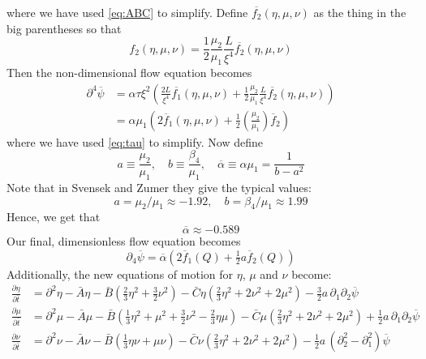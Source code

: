 \documentclass[reqno]{article}
\begin{document}
	where we have used \eqref{eq:ABC} to simplify. Define $\overline{f_2}(\eta, \mu, \nu)$ as the thing in the big parentheses so that
	\begin{equation}
		f_2(\eta, \mu, \nu) = \frac12 \frac{\mu_2}{\mu_1} \frac{L}{\xi^4} \overline{f_2}(\eta, \mu, \nu)
	\end{equation}
	Then the non-dimensional flow equation becomes
	\begin{equation}
	\begin{split}
		\partial^4 \overline{\psi}
		&= \alpha \tau \xi^2 \left(
		\frac{2L}{\xi^4} \overline{f_1}(\eta, \mu, \nu)
		+ \frac12 \frac{\mu_2}{\mu_1} \frac{L}{\xi^4} \overline{f_2}(\eta, \mu, \nu)
		\right) \\
		&= \alpha \mu_1 \left(
		2 \overline{f}_1 (\eta, \mu, \nu)
		+ \frac12 \left( \frac{\mu_2}{\mu_1} \right) \overline{f}_2
		\right)
	\end{split}
	\end{equation}
	where we have used \eqref{eq:tau} to simplify. Now define
	\begin{equation} \label{eq:dimensionless-constants}
		a \equiv \frac{\mu_2}{\mu_1},
		\quad
		b \equiv \frac{\beta_4}{\mu_1},
		\quad
		\overline{\alpha} \equiv \alpha \mu_1
		= \frac{1}{b - a^2}
	\end{equation}
	Note that in Svensek and Zumer they give the typical values:
	\begin{equation}
		a = \mu_2/\mu_1 \approx -1.92,
		\quad b = \beta_4/\mu_1 \approx 1.99
	\end{equation}
	Hence, we get that
	\begin{equation}
		\overline{\alpha} \approx -0.589
	\end{equation}
	Our final, dimensionless flow equation becomes
	\begin{equation}
		\partial_4 \overline{\psi}
		= \overline{\alpha} \left(
		2 \overline{f}_1 (Q)
		+ \tfrac12 a \overline{f}_2 (Q)
		\right)
	\end{equation}
	Additionally, the new equations of motion for $\eta$, $\mu$ and $\nu$ become:
	\begin{equation}\label{eq:dimensionless-flow-eoms}
	\begin{split}
		\frac{\partial \eta}{\partial \bar{t}} &= \partial^2 \eta - \bar{A}\eta - \bar{B}\left( \tfrac 23 \eta^2 + \tfrac 32 \nu^2\right) - \bar{C} \eta \left( \tfrac23 \eta^2 + 2\nu^2 + 2\mu^2\right) - \tfrac32 a\,\partial_1 \partial_2 \overline{\psi} \\
		\frac{\partial \mu}{\partial \bar{t}} &= \partial^2 \mu - \bar{A}\mu - \bar{B}\left( \tfrac13 \eta^2 + \mu^2 + \tfrac32 \nu^2 - \tfrac23 \eta \mu \right) - \bar{C}\mu\left(\tfrac23 \eta^2 + 2\nu^2 + 2\mu^2\right) + \tfrac12 a\,\partial_1 \partial_2 \overline{\psi} \\
		\frac{\partial \nu}{\partial \bar{t}} &= \partial^2 \nu - \bar{A}\nu - \bar{B}\left( \tfrac13\eta\nu + \mu\nu \right) - \bar{C}\nu\left(\tfrac23\eta^2 + 2\nu^2 + 2\mu^2\right)
		- \tfrac12 a\, \left( \partial_2^2 - \partial_1^2 \right)
		\overline{\psi}
	\end{split}
	\end{equation}
	
\end{document}
